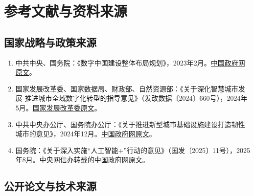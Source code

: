 \section{参考文献与资料来源}
\sloppy

\subsection*{国家战略与政策来源}

\begin{enumerate}
    \item 中共中央、国务院：《数字中国建设整体布局规划》，2023年2月。\href{https://www.gov.cn/zhengce/2023-02/27/content_5743484.htm}{中国政府网原文}。
    \item 国家发展改革委、国家数据局、财政部、自然资源部：《关于深化智慧城市发展 推进城市全域数字化转型的指导意见》（发改数据〔2024〕660号），2024年5月。\href{https://www.ndrc.gov.cn/xxgk/zcfb/tz/202405/t20240520_1386326_ext.html}{国家发展改革委原文}。
    \item 中共中央办公厅、国务院办公厅：《关于推进新型城市基础设施建设打造韧性城市的意见》，2024年12月。\href{https://www.gov.cn/zhengce/202412/content_6991171.htm}{中国政府网原文}。
    \item 国务院：《关于深入实施“人工智能+”行动的意见》（国发〔2025〕11号），2025年8月。\href{https://www.cac.gov.cn/2025-08/27/c_1758018277755538.htm}{中央网信办转载的中国政府网原文}。
\end{enumerate}

\subsection*{公开论文与技术来源}

